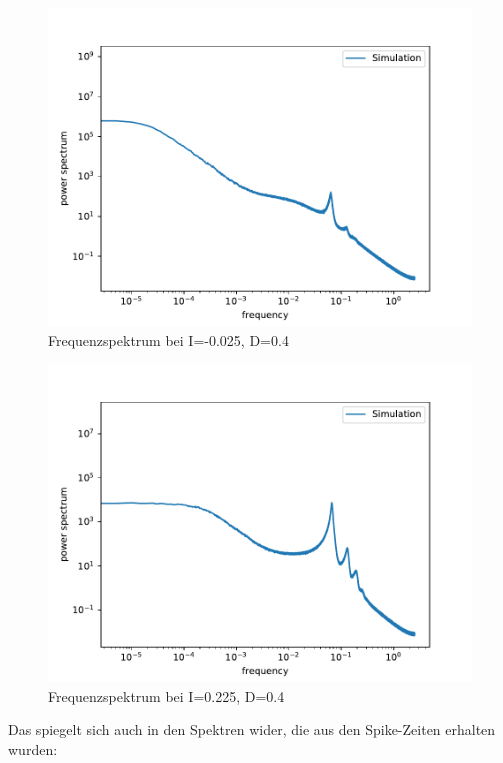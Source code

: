 \documentclass[12pt,a4paper]{article}
\begin{document}
\begin{figure}[H]
	\centering
	\includegraphics[scale=0.9]{inapikrealfast3jjem3407.pdf}
	\caption{Frequenzspektrum bei I=-0.025, D=0.4}
	\label{sp407}
\end{figure}
\begin{figure}[H]
	\centering
	\includegraphics[scale=0.9]{inapikrealfast3jjem34017.pdf}
	\caption{Frequenzspektrum bei I=0.225, D=0.4}
	\label{sp4017}
\end{figure}
Das spiegelt sich auch in den Spektren wider, die aus den Spike-Zeiten erhalten wurden:
\end{document}
